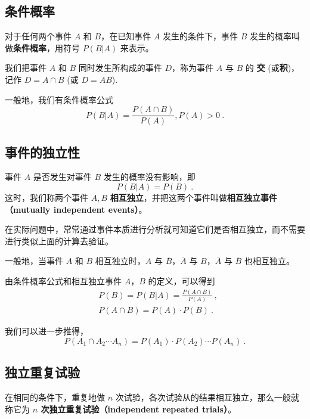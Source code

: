 

\subsection{条件概率}
对于任何两个事件 $A$ 和 $B$，在已知事件 $A$ 发生的条件下，事件 $B$ 发生的概率叫做\textbf{条件概率}，用符号 $P(B|A)$ 来表示。

我们把事件 $A$ 和 $B$ 同时发生所构成的事件 $D$，称为事件 $A$ 与 $B$ 的 \textbf{交} (或\textbf{积})，记作 $D = A \cap B$ (或 $D = AB$).

一般地，我们有条件概率公式
\begin{equation}
P(B|A) = \frac{P(A \cap B)}{P(A)},P(A)>0~.
\end{equation}

\subsection{事件的独立性}
事件 $A$ 是否发生对事件 $B$ 发生的概率没有影响，即
\begin{equation}
P(B|A) = P(B)~.
\end{equation}
这时，我们称两个事件 $A,B$ \textbf{相互独立}，并把这两个事件叫做\textbf{相互独立事件（mutually independent events）}。

在实际问题中，常常通过事件本质进行分析就可知道它们是否相互独立，而不需要进行类似上面的计算去验证。

一般地，当事件 $A$ 和 $B$ 相互独立时，$A$ 与 $\overline{B}$，$\overline{A}$ 与 $B$，$\overline{A}$ 与 $\overline{B}$ 也相互独立。

由条件概率公式和相互独立事件 $A$，$B$ 的定义，可以得到
\begin{equation}
\begin{aligned}
&P(B) = P(B|A) = \frac{P(A \cap B)}{P(A)}~, \\
&P(A\cap B) = P(A) \cdot P(B)~.
\end{aligned}
\end{equation}

我们可以进一步推得，
\begin{equation}
P(A_1\cap A_2 \cdots A_n) = P(A_1) \cdot P(A_2) \cdots P(A_n)~.
\end{equation}

\subsection{独立重复试验}
在相同的条件下，重复地做 $n$ 次试验，各次试验从的结果相互独立，那么一般就称它为 \textbf{ $n$ 次独立重复试验（independent repeated trials）}。

